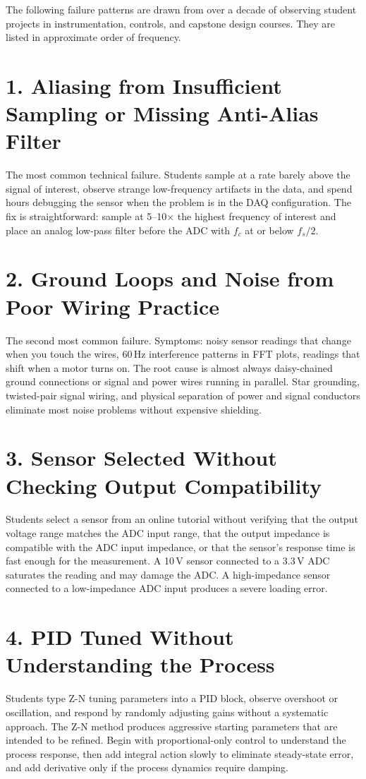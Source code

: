 \documentclass[11pt,letterpaper,twoside,openany]{book}
\begin{document}
The following failure patterns are drawn from over a decade of observing student projects in instrumentation, controls, and capstone design courses. They are listed in approximate order of frequency.

\section*{1. Aliasing from Insufficient Sampling or Missing Anti-Alias Filter}
The most common technical failure. Students sample at a rate barely above the signal of interest, observe strange low-frequency artifacts in the data, and spend hours debugging the sensor when the problem is in the DAQ configuration. The fix is straightforward: sample at 5--10$\times$ the highest frequency of interest and place an analog low-pass filter before the ADC with $f_c$ at or below $f_s/2$.

\section*{2. Ground Loops and Noise from Poor Wiring Practice}
The second most common failure. Symptoms: noisy sensor readings that change when you touch the wires, 60\,Hz interference patterns in FFT plots, readings that shift when a motor turns on. The root cause is almost always daisy-chained ground connections or signal and power wires running in parallel. Star grounding, twisted-pair signal wiring, and physical separation of power and signal conductors eliminate most noise problems without expensive shielding.

\section*{3. Sensor Selected Without Checking Output Compatibility}
Students select a sensor from an online tutorial without verifying that the output voltage range matches the ADC input range, that the output impedance is compatible with the ADC input impedance, or that the sensor's response time is fast enough for the measurement. A 10\,V sensor connected to a 3.3\,V ADC saturates the reading and may damage the ADC. A high-impedance sensor connected to a low-impedance ADC input produces a severe loading error.

\section*{4. PID Tuned Without Understanding the Process}
Students type Z-N tuning parameters into a PID block, observe overshoot or oscillation, and respond by randomly adjusting gains without a systematic approach. The Z-N method produces aggressive starting parameters that are intended to be refined. Begin with proportional-only control to understand the process response, then add integral action slowly to eliminate steady-state error, and add derivative only if the process dynamics require damping.
\end{document}
